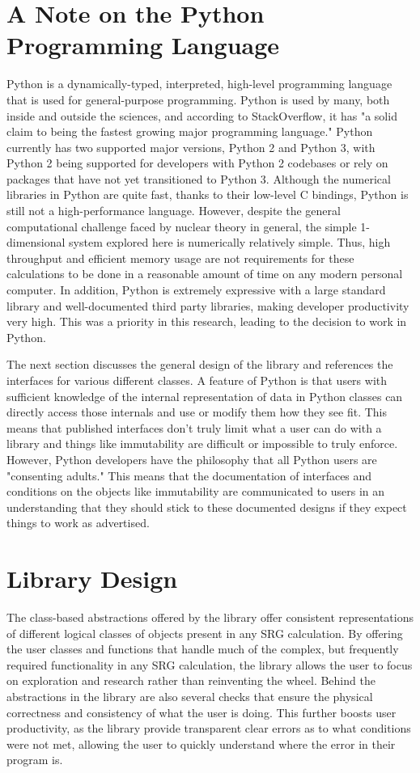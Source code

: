\section{A Note on the Python Programming Language}

Python is a dynamically-typed, interpreted, high-level programming language that is used for general-purpose programming. Python is used by many, both inside and outside the sciences, and according to StackOverflow, it has "a solid claim to being the fastest growing major programming language." Python currently has two supported major versions, Python 2 and Python 3, with Python 2 being supported for developers with Python 2 codebases or rely on packages that have not yet transitioned to Python 3. Although the numerical libraries in Python are quite fast, thanks to their low-level C bindings, Python is still not a high-performance language. However, despite the general computational challenge faced by nuclear theory in general, the simple 1-dimensional system explored here is numerically relatively simple. Thus, high throughput and efficient memory usage are not requirements for these calculations to be done in a reasonable amount of time on any modern personal computer. In addition, Python is extremely expressive with a large standard library and well-documented third party libraries, making developer productivity very high. This was a priority in this research, leading to the decision to work in Python.

The next section discusses the general design of the library and references the interfaces for various different classes. A feature of Python is that users with sufficient knowledge of the internal representation of data in Python classes can directly access those internals and use or modify them how they see fit. This means that published interfaces don't truly limit what a user can do with a library and things like immutability are difficult or impossible to truly enforce. However, Python developers have the philosophy that all Python users are "consenting adults." This means that the documentation of interfaces and conditions on the objects like immutability are communicated to users in an understanding that they should stick to these documented designs if they expect things to work as advertised.

\section{Library Design}

The class-based abstractions offered by the library offer consistent representations of different logical classes of objects present in any SRG calculation. By offering the user classes and functions that handle much of the complex, but frequently required functionality in any SRG calculation, the library allows the user to focus on exploration and research rather than reinventing the wheel. Behind the abstractions in the library are also several checks that ensure the physical correctness and consistency of what the user is doing. This further boosts user productivity, as the library provide transparent clear errors as to what conditions were not met, allowing the user to quickly understand where the error in their program is.

